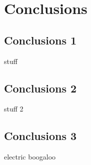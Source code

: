 \section{Conclusions}
\subsection{Conclusions 1} \label{conc:sect:conc1}
stuff
\subsection{Conclusions 2} \label{conc:sect:conc2}
stuff 2
\subsection{Conclusions 3} \label{conc:sect:conc3}
electric boogaloo